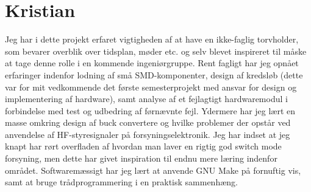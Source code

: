 \section{Kristian}

Jeg har i dette projekt erfaret vigtigheden af at have en ikke-faglig torvholder, som bevarer overblik over tidsplan, møder etc. og selv blevet inspireret til måske at tage denne rolle i en kommende ingeniørgruppe.
Rent fagligt har jeg opnået erfaringer indenfor lodning af små SMD-komponenter, design af kredsløb (dette var for mit vedkommende det første semesterprojekt med ansvar for design og implementering af hardware), samt analyse af et fejlagtigt hardwaremodul i forbindelse med test og udbedring af førnævnte fejl.
Ydermere har jeg lært en masse omkring design af buck convertere og hvilke problemer der opstår ved anvendelse af HF-styresignaler på forsyningselektronik.
Jeg har indset at jeg knapt har rørt overfladen af hvordan man laver en rigtig god switch mode forsyning, men dette har givet inspiration til endnu mere læring indenfor området.
Softwaremæssigt har jeg lært at anvende GNU Make på fornuftig vis, samt at bruge trådprogrammering i en praktisk sammenhæng.